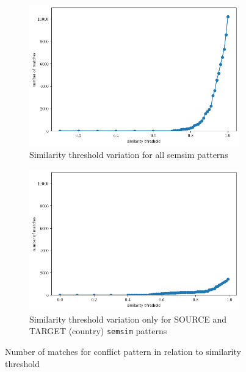 \documentclass[11pt]{scrreprt}
\begin{document}
\begin{figure}
     \centering
     \begin{subfigure}[t]{0.9\textwidth}
         \includegraphics[width=\textwidth]{countries_20-most-popul_thresholds.png}
         \caption{Similarity threshold variation for all \textsf{semsim} patterns}
         \label{fig:countries_20-most-popul_thresholds}
     \end{subfigure}
     \begin{subfigure}[t]{0.9\textwidth}
         \includegraphics[width=\textwidth]{countries_20-most-popul_thresholds-countries.png}
         \caption{Similarity threshold variation only for \textsf{SOURCE} and \textsf{TARGET} (country) \texttt{semsim} patterns}
         \label{fig:countries_20-most-popul_thresholds-countries}
     \end{subfigure}
\caption{Number of matches for conflict pattern in relation to similarity threshold}
\label{fig:case-study-conflict-countries-1}   
\end{figure}
\end{document}
